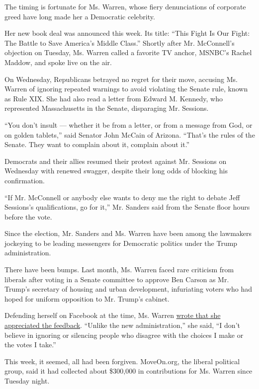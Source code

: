 The timing is fortunate for Ms. Warren, whose fiery denunciations of
corporate greed have long made her a Democratic celebrity.

Her new book deal was announced this week. Its title: ``This Fight Is
Our Fight: The Battle to Save America's Middle Class.'' Shortly after
Mr. McConnell's objection on Tuesday, Ms. Warren called a favorite TV
anchor, MSNBC's Rachel Maddow, and spoke live on the air.

On Wednesday, Republicans betrayed no regret for their move, accusing
Ms. Warren of ignoring repeated warnings to avoid violating the Senate
rule, known as Rule XIX. She had also read a letter from Edward M.
Kennedy, who represented Massachusetts in the Senate, disparaging Mr.
Sessions.

``You don't insult --- whether it be from a letter, or from a message
from God, or on golden tablets,'' said Senator John McCain of Arizona.
``That's the rules of the Senate. They want to complain about it,
complain about it.''

Democrats and their allies resumed their protest against Mr. Sessions on
Wednesday with renewed swagger, despite their long odds of blocking his
confirmation.

``If Mr. McConnell or anybody else wants to deny me the right to debate
Jeff Sessions's qualifications, go for it,'' Mr. Sanders said from the
Senate floor hours before the vote.

Since the election, Mr. Sanders and Ms. Warren have been among the
lawmakers jockeying to be leading messengers for Democratic politics
under the Trump administration.

There have been bumps. Last month, Ms. Warren faced rare criticism from
liberals after voting in a Senate committee to approve Ben Carson as Mr.
Trump's secretary of housing and urban development, infuriating voters
who had hoped for uniform opposition to Mr. Trump's cabinet.

Defending herself on Facebook at the time, Ms. Warren
\href{https://www.facebook.com/senatorelizabethwarren/posts/716640075165155}{wrote
that she appreciated the feedback}. ``Unlike the new administration,''
she said, ``I don't believe in ignoring or silencing people who disagree
with the choices I make or the votes I take.''

This week, it seemed, all had been forgiven. MoveOn.org, the liberal
political group, said it had collected about \$300,000 in contributions
for Ms. Warren since Tuesday night.

